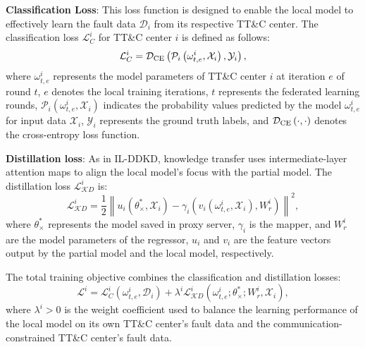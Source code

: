\textbf{Classification Loss}: This loss function is designed to enable the local model to effectively learn the fault data ${{\mathscr D}_i}$ from its respective TT\&C center. 
The classification loss $\mathcal L_C^i$ for TT\&C center $i$ is defined as follows:
\begin{equation}
	\label{eq:LCi}
	\mathcal L_C^i = {{\mathcal D}_{\rm{CE}}}\left( {{\mathcal P_i}\left( {\omega _{t,e}^i,{\mathcal X_i}} \right),{\mathcal Y_i}} \right),
\end{equation}
\noindent where $\omega _{t,e}^i$ represents the model parameters of TT\&C center $i$ at iteration $e$ of round $t$, 
$e$ denotes the local training iterations, 
$t$ represents the federated learning rounds, 
${\mathcal P_i}\left( {\omega _{t,e}^i, {\mathcal X_i}} \right)$ indicates the probability values predicted by the model $\omega _{t,e}^i$ for input data ${\mathcal X_i}$, 
${\mathcal Y_i}$ represents the ground truth labels, 
and ${{\mathcal D}_{\rm{CE}}}\left( { \cdot ,\cdot } \right)$ denotes the cross-entropy loss function.

\textbf{Distillation loss}: As in IL-DDKD, knowledge transfer uses intermediate-layer attention maps to align the local model's focus with the partial model. The distillation loss $\mathcal L_{\mathcal KD}^i$ is:
\begin{equation}
	\label{eq:LKDi}
	\mathcal L_{\mathcal KD}^i = \frac{1}{2}{\left\| {{u_i}\left( {\theta _ \times ^ * ,{\mathcal  X_i}} \right) - {\gamma _i}\left( {{v_i}\left( {\omega _{t,e}^i,{\mathcal  X_i}} \right),W_r^i} \right)} \right\|^2},
\end{equation}
\noindent where $\theta _ \times ^ * $ represents the model saved in proxy server, 
$\gamma_i$ is the mapper, and $W^i_r$ are the model parameters of the regressor,
${u_i}$ and ${v_i}$ are the feature vectors output by the partial model and the local model, respectively. 

The total training objective combines the classification and distillation losses:
\begin{equation}
	{\mathcal L^i} = \mathcal L_C^i\left( {\omega _{t,e}^i,{{\mathscr D}_i}} \right) + {\lambda ^i}\mathcal L_{\mathcal KD}^i\left( {\omega _{t,e}^i;\theta _ \times ^ * ;W_r^i,{\mathcal X_i}} \right),
\end{equation}
where $\lambda^i > 0$ is the weight coefficient 
used to balance the learning performance of the local model on its own TT\&C center's fault data 
and the communication-constrained TT\&C center's fault data.

